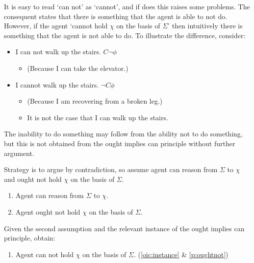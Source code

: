 \documentclass[10pt]{article}
\begin{document}
\begin{note}
  It is easy to read `can not' as `cannot', and if does this raises some problems. The consequent states that there is something that the agent is able to not do. However, if the agent `cannot hold \(\chi\) on the basis of \(\Sigma\)' then intuitively there is something that the agent is not able to do. To illustrate the difference, consider:
  \begin{itemize}
  \item I can not walk up the stairs. \hfill \(C \lnot \phi\)
    \begin{itemize}
    \item (Because I can take the elevator.)
    \end{itemize}
  \item I cannot walk up the stairs. \hfill  \(\lnot C \phi\)
    \begin{itemize}
    \item (Because I am recovering from a broken leg.)
    \item It is not the case that I can walk up the stairs.
    \end{itemize}
  \end{itemize}
  The inability to do something may follow from the ability not to do something, but this is not obtained from the ought implies can principle without further argument.
\end{note}

Strategy is to argue by contradiction, so assume agent can reason from \(\Sigma\) to \(\chi\) and ought not hold \(\chi\) on the basis of \(\Sigma\).

\begin{enumerate}[label=P\arabic*., ref=P\arabic*, resume]
\item\label{p:can} Agent can reason from \(\Sigma\) to \(\chi\).
\item\label{p:oughtnot} Agent ought not hold \(\chi\) on the basis of \(\Sigma\).
\end{enumerate}

Given the second assumption and the relevant instance of the ought implies can principle, obtain:

\begin{enumerate}[label=P\arabic*., ref=P\arabic*, resume]
\item\label{p:can-not} Agent can not hold \(\chi\) on the basis of \(\Sigma\). \hfill (\ref{oic:instance} \& \ref{p:oughtnot})
\end{enumerate}
\end{document}
